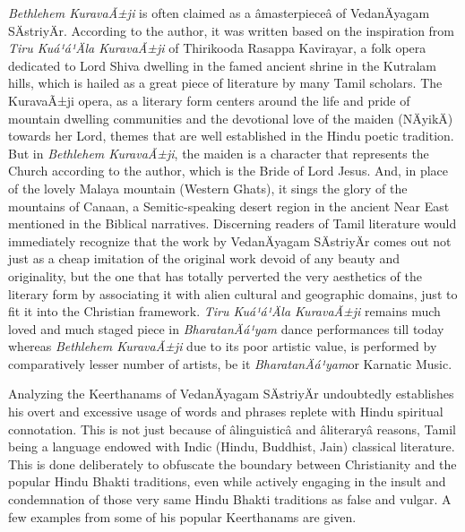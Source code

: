 \textit{Bethlehem KuravaÃ±ji} is often claimed as a âmasterpieceâ of VedanÄya\-gam SÄstriyÄr. According to the author, it was written based on the inspiration from \textit{Tiru Kuá¹á¹Äla KuravaÃ±ji} of Thirikooda Rasappa Kavirayar, a folk opera dedicated to Lord Shiva dwelling in the famed ancient shrine in the Kutralam hills, which is hailed as a great piece of literature by many Tamil scholars. The KuravaÃ±ji opera, as a literary form centers around the life and pride of mountain dwelling communities and the devotional love of the maiden (NÄyikÄ) towards her Lord, themes that are well established in the Hindu poetic tradition. But in \textit{Bethlehem KuravaÃ±ji}, the maiden is a character that represents the Church according to the author, which is the Bride of Lord Jesus. And, in place of the lovely Malaya mountain (Western Ghats), it sings the glory of the mountains of Canaan, a Semitic-speaking desert region in the ancient Near East mentioned in the Biblical narratives. Discerning readers of Tamil literature would immediately recognize that the work by VedanÄyagam SÄstriyÄr comes out not just as a cheap imitation of the original work devoid of any beauty and originality, but the one that has totally perverted the very aesthetics of the literary form by associating it with alien cultural and geographic domains, just to fit it into the Christian framework. \textit{Tiru Kuá¹á¹Äla KuravaÃ±ji }remains much loved and much staged piece in \textit{BharatanÄá¹­yam} dance performances till today whereas \textit{Bethlehem KuravaÃ±ji} due to its poor artistic value, is performed by comparatively lesser number of artists, be it \textit{BharatanÄá¹­yam}or Karnatic Music.

\newpage

Analyzing the Keerthanams of VedanÄyagam SÄstriyÄr undoubtedly establishes his overt and excessive usage of words and phrases replete with Hindu spiritual connotation. This is not just because of âlinguisticâ and âliteraryâ reasons, Tamil being a language endowed with Indic (Hindu, Buddhist, Jain) classical literature. This is done deliberately to obfuscate the boundary between Christianity and the popular Hindu Bhakti traditions, even while actively engaging in the insult and condemnation of those very same Hindu Bhakti traditions as false and vulgar. A few examples from some of his popular Keerthanams are given.

